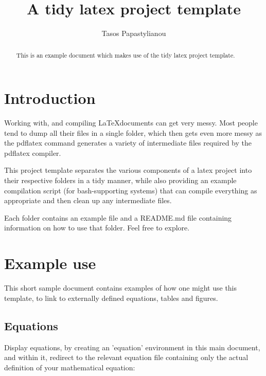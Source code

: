 \documentclass{dependencies/styles/IEEEtran}
\title { A tidy latex project template }
\author{ Tasos Papastylianou }
\begin{document}
  
  \maketitle
  
  \begin{abstract}
    This is an example document which makes use of the tidy latex project template.
  \end{abstract}

  \section{Introduction}

    Working with, and compiling \LaTeX documents can get very messy. Most people tend to dump all their files in a single folder, which then gets even more messy as the pdflatex command generates a variety of intermediate files required by the pdflatex compiler.

    This project template separates the various components of a latex project into their respective folders in a tidy manner, while also providing an example compilation script (for bash-supporting systems) that can compile everything as appropriate and then clean up any intermediate files.

    Each folder contains an example file and a README.md file containing information on how to use that folder. Feel free to explore.

  \section{Example use}

    This short sample document contains examples of how one might use this template, to link to externally defined equations, tables and figures.
    
    \subsection{ Equations }

      Display equations, by creating an 'equation' environment in this main document, and within it, redirect to the relevant equation file
      containing only the actual definition of your mathematical equation:

      \begin{equation}
         \label{eq:ExampeEquation}
         
      \end{equation}
\end{document}
